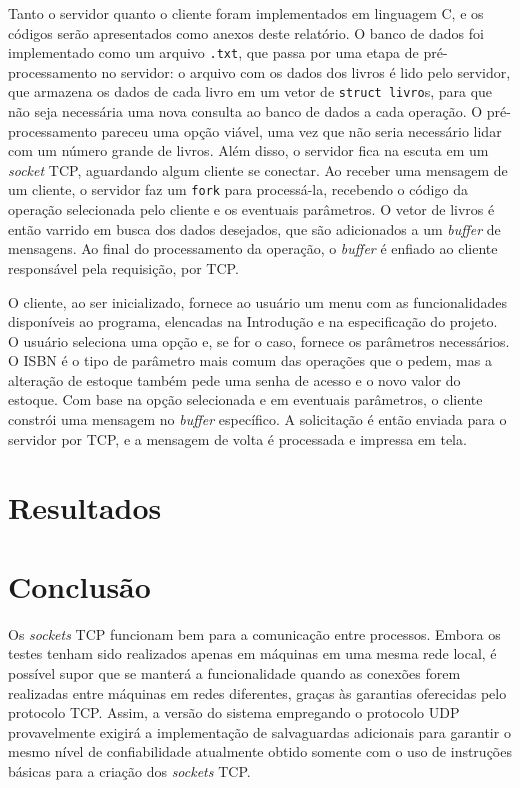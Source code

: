 \documentclass[11pt, brazil]{article} %
\begin{document}
Tanto o servidor quanto o cliente foram implementados em linguagem C, e os códigos serão apresentados como anexos deste relatório.
O banco de dados foi implementado como um arquivo \texttt{.txt}, que passa por uma etapa de pré-processamento no servidor: o arquivo com os dados dos livros é lido pelo servidor, que armazena os dados de cada livro em um vetor de \texttt{struct livro}s, para que não seja necessária uma nova consulta ao banco de dados a cada operação. 
O pré-processamento pareceu uma opção viável, uma vez que não seria necessário lidar com um número grande de livros. 
Além disso, o servidor fica na escuta em um \emph{socket} TCP, aguardando algum cliente se conectar. 
Ao receber uma mensagem de um cliente, o servidor faz um \texttt{fork} para processá-la, recebendo o código da operação selecionada pelo cliente e os eventuais parâmetros.
O vetor de livros é então varrido em busca dos dados desejados, que são adicionados a um \emph{buffer} de mensagens.
Ao final do processamento da operação, o \emph{buffer} é enfiado ao cliente responsável pela requisição, por TCP.

O cliente, ao ser inicializado, fornece ao usuário um menu com as funcionalidades disponíveis ao programa, elencadas na Introdução e na especificação do projeto. 
O usuário seleciona uma opção e, se for o caso, fornece os parâmetros necessários.
O ISBN é o tipo de parâmetro mais comum das operações que o pedem, mas a alteração de estoque também pede uma senha de acesso e o novo valor do estoque. 
Com base na opção selecionada e em eventuais parâmetros, o cliente constrói uma mensagem no \emph{buffer} específico. 
A solicitação é então enviada para o servidor por TCP, e a mensagem de volta é processada e impressa em tela.


\section{Resultados}

\section{Conclusão}

Os \emph{sockets} TCP funcionam bem para a comunicação entre processos. Embora os testes tenham sido realizados apenas em máquinas em uma mesma rede local, é possível supor que se manterá a funcionalidade quando as conexões forem realizadas entre máquinas em redes diferentes, graças às garantias oferecidas pelo protocolo TCP. Assim, a versão do sistema empregando o protocolo UDP provavelmente exigirá a implementação de salvaguardas adicionais para garantir o mesmo nível de confiabilidade atualmente obtido somente com o uso de instruções básicas para a criação dos \emph{sockets} TCP.
\end{document}
